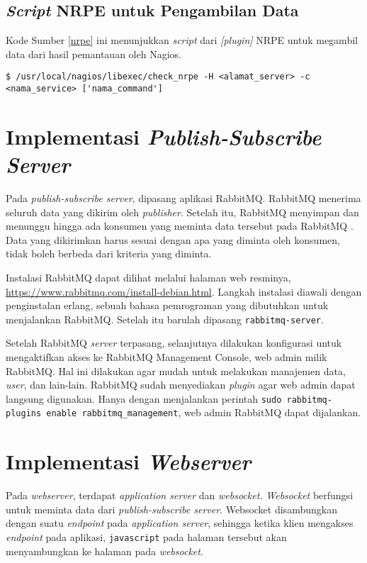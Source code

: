 \begin{enumerate}
	\subsection{\textit{Script} NRPE untuk Pengambilan Data}
	Kode Sumber \ref{nrpe} ini menunjukkan \textit{script} dari \textit{[plugin]} NRPE untuk megambil data dari hasil pemantauan oleh Nagios.
	
\begin{lstlisting}[frame=single,breaklines,caption={Perintah Mengumpulkan Data Perangkat dengan NRPE},label=nrpe, captionpos=b]
$ /usr/local/nagios/libexec/check_nrpe -H <alamat_server> -c <nama_service> ['nama_command']
\end{lstlisting} 
	
	
	\section{Implementasi \textit{Publish-Subscribe Server}}
	Pada \textit{publish-subscribe server}, dipasang aplikasi RabbitMQ. RabbitMQ menerima seluruh data yang dikirim oleh \textit{publisher}. Setelah itu, RabbitMQ
	menyimpan dan menunggu hingga ada konsumen yang
	meminta data tersebut pada RabbitMQ . Data yang dikirimkan harus sesuai dengan apa yang diminta oleh konsumen, tidak boleh berbeda dari kriteria yang diminta. 
	
	Instalasi RabbitMQ dapat dilihat melalui halaman web resminya, \url{https://www.rabbitmq.com/install-debian.html}. Langkah instalasi diawali dengan penginstalan erlang, sebuah bahasa pemrograman yang dibutuhkan untuk menjalankan RabbitMQ. Setelah itu barulah dipasang \texttt{rabbitmq-server}. 
	
	Setelah RabbitMQ \textit{server} terpasang, selanjutnya dilakukan konfigurasi untuk mengaktifkan akses ke RabbitMQ Management Console, web admin milik RabbitMQ. Hal ini dilakukan agar mudah untuk melakukan manajemen data, \textit{user}, dan lain-lain. RabbitMQ sudah menyediakan \textit{plugin} agar web admin dapat langsung digunakan. Hanya dengan menjalankan perintah \texttt{sudo rabbitmq-plugins enable rabbitmq\_management}, web admin RabbitMQ dapat dijalankan. 
	
	\section{Implementasi \textit{Webserver}}
	Pada \textit{webserver}, terdapat \textit{application server} dan \textit{websocket.} \textit{Websocket} berfungsi untuk meminta data dari \textit{publish-subscribe server}. Websocket disambungkan dengan suatu \textit{endpoint} pada \textit{application server}, sehingga ketika klien mengakses \textit{endpoint} pada aplikasi, \texttt{javascript} pada halaman tersebut akan menyambungkan ke halaman pada \textit{websocket}.
	

\end{enumerate}

